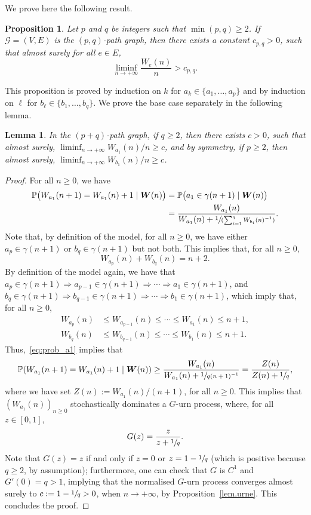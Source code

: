 \documentclass[JEP,XML,SOM,Unicode,NoFloatCountersInSection,published]{cedram}
\let\mathcal\mathscr
\let \nicefrac\sfrac
\newcommand{\spfrac}[2]{\sfrac{#1}{(#2)}}
\newcommand{\bW}{\boldsymbol{W}}
\numberwithin{equation}{section}
\newtheorem{lemma}[theorem]{Lemma}
\newtheorem{proposition}[theorem]{Proposition}
\theoremstyle{definition}
\begin{document}
\label{subsec.2paths.1}
We prove here the following result.

\begin{proposition}\label{prop:multiedges}
Let $p$ and $q$ be integers such that $\min(p, q)\geq 2$.
If $\mathcal G = (V,E)$ is the $(p,q)$-path graph, then there exists a constant $c_{p,q}>0$, such that almost surely for all $e\in E$,
\[
\liminf_{n\to +\infty} \frac{W_e(n)}n> c_{p,q}.
\]
\end{proposition}
This proposition is proved by induction on $k$ for $a_k\in \{a_1, \ldots, a_p\}$ and by induction on $\ell$ for $b_\ell\in \{b_1, \ldots, b_q\}$. We prove the base case separately in the following lemma.
\begin{lemma}\label{lem:liminf_a1}
In the $(p+q)$-path graph, if $q\geq 2$, then there exists $c>0$, such that almost surely, $\liminf_{n\to+\infty} W_{a_1}(n)/n\ge c$, and by symmetry, if $p\geq 2$, then almost surely, $\liminf_{n\to+\infty} W_{b_1}(n)/n\ge c$.
\end{lemma}

\begin{proof}
For all $n\geq 0$, we have
\begin{equation}
\begin{aligned}\label{eq:prob_a1}
\mathbb P\bigl(W_{a_1}(n+1) = W_{a_1}(n)+1 \mid \bW(n)\bigr)
&=\mathbb P\bigl(a_1 \in \gamma(n+1)\mid \bW(n)\bigr)\\
&= \frac{W_{a_1}(n)}{W_{a_1}(n)+
\spfrac{1}{\sum_{i=1}^q W_{b_i}(n)^{-1}}}.
\end{aligned}
\end{equation}
Note that, by definition of the model,
for all $n\geq 0$,
we have either $a_p\in\gamma(n+1)$ or $b_q\in\gamma(n+1)$ but not both.
This implies that, for all $n\geq 0$,
\[
W_{a_p}(n)+W_{b_q}(n)=n+2.
\]
By definition of the model again,
we have that $a_p\in\gamma(n+1)\Rightarrow a_{p-1}\in \gamma(n+1) \Rightarrow \cdots \Rightarrow a_1\in\gamma(n+1)$, and
$b_q\in\gamma(n+1)\Rightarrow b_{q-1}\in\gamma(n+1)\Rightarrow \cdots \Rightarrow b_1\in\gamma(n+1)$, which imply that, for all $n\geq 0$,
\begin{align*}
W_{a_p}(n)&\leq W_{a_{p-1}}(n)\leq \cdots \leq W_{a_1}(n)\leq n+1,\\
\tag*{and}
W_{b_q}(n)&\leq W_{b_{q-1}}(n)\leq\cdots \leq W_{b_1}(n)\leq n+1.
\end{align*}
Thus,~\eqref{eq:prob_a1} implies that
\[
\mathbb P(W_{a_1}(n+1) = W_{a_1}(n)+1 \mid \bW(n))
\geq \frac{W_{a_1}(n)}{W_{a_1}(n)+\sfrac{1}{q(n+1)^{-1}}}
=\frac{Z(n)}{Z(n)+\nicefrac 1q},
\]
where we have set $Z(n):=W_{a_1}(n)/(n+1)$, for all $n\geq 0$.
This implies that $(W_{a_1}(n))_{n\ge 0}$ stochastically dominates a $G$-urn process,
where, for all $z\in[0,1]$,
\[
G(z) = \frac{z}{z+\nicefrac1{q}}.
\]
Note that $G(z) = z$ if and only if $z=0$ or $z=1-{\nicefrac1q}$
(which is positive because $q\geq 2$, by assumption);
furthermore, one can check that $G$ is $C^1$ and $G'(0) = q > 1$,
implying that the normalised $G$-urn process converges almost surely to $c:= 1-\nicefrac1q>0$, when $n\to+\infty$, by Proposition~\ref{lem.urne}.
This concludes the proof.
\end{proof}
\end{document}

